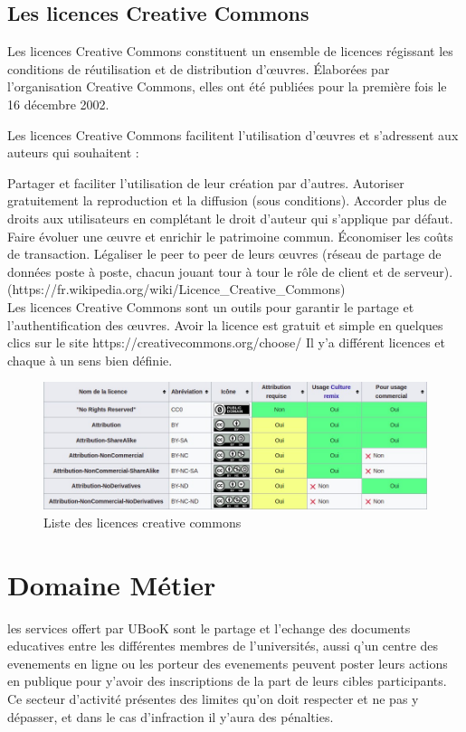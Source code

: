 \documentclass[12pt]{report}
\begin{document}
\subsection{Les licences Creative Commons}

Les licences Creative Commons constituent un ensemble de licences régissant les conditions de réutilisation et de distribution d'œuvres. Élaborées par l'organisation Creative Commons, elles ont été publiées pour la première fois le 16 décembre 2002.

Les licences Creative Commons facilitent l'utilisation d’œuvres et s'adressent aux auteurs qui souhaitent :

Partager et faciliter l'utilisation de leur création par d'autres.
Autoriser gratuitement la reproduction et la diffusion (sous conditions).
Accorder plus de droits aux utilisateurs en complétant le droit d'auteur qui s'applique par défaut.
Faire évoluer une œuvre et enrichir le patrimoine commun.
Économiser les coûts de transaction.
Légaliser le peer to peer de leurs œuvres (réseau de partage de données poste à poste, chacun jouant tour à tour le rôle de client et de serveur).
\\(https://fr.wikipedia.org/wiki/Licence\_Creative\_Commons)\\

Les licences Creative Commons sont un outils pour garantir le partage et
l’authentification des œuvres.
Avoir la licence est gratuit et simple en quelques clics sur le site
https://creativecommons.org/choose/
Il y’a différent licences et chaque à un sens bien définie.
\begin{figure}[h]
    \centering
    \includegraphics[width=1\textwidth]{creative commons}
    \caption{Liste des licences creative commons}
    \label{fig:mesh1}
\end{figure}
\newpage
\section{Domaine Métier} 

les services offert par UBooK sont le partage et l'echange des documents educatives entre les différentes membres de l'universités, aussi q'un centre des evenements en ligne ou les porteur des evenements peuvent poster leurs actions en publique pour y'avoir des inscriptions de la part de leurs cibles participants. 
Ce secteur d'activité présentes des limites qu'on doit respecter et ne pas y dépasser, et dans le cas d'infraction il y'aura des pénalties.
\end{document}

